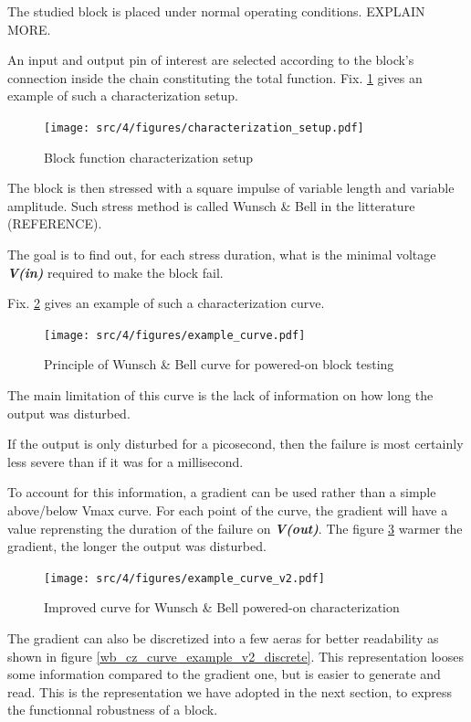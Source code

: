 The studied block is placed under normal operating conditions. EXPLAIN MORE.

An input and output pin of interest are selected according to the block's connection inside the chain constituting the total function.
Fix. \ref{block_function_cz} gives an example of such a characterization setup.

\begin{figure}[!htbp]
  \centering
  \texttt{[image: src/4/figures/characterization\_setup.pdf]}
  \caption{Block function characterization setup}
  \label{block_function_cz}
\end{figure}

The block is then stressed with a square impulse of variable length and variable amplitude.
Such stress method is called Wunsch & Bell in the litterature (REFERENCE).

The goal is to find out, for each stress duration, what is the minimal voltage \textbf{\textit{V(in)}} required to make the block fail.

Fix. \ref{wb_cz_curve_example} gives an example of such a characterization curve.

\begin{figure}[!htbp]
  \centering
  \texttt{[image: src/4/figures/example\_curve.pdf]}
  \caption{Principle of Wunsch & Bell curve for powered-on block testing}
  \label{wb_cz_curve_example}
\end{figure}

The main limitation of this curve is the lack of information on how long the output was disturbed.

If the output is only disturbed for a picosecond, then the failure is most certainly less severe than if it was for a millisecond.

To account for this information, a gradient can be used rather than a simple above/below Vmax curve.
For each point of the curve, the gradient will have a value reprensting the duration of the failure on \textbf{\textit{V(out)}}.
The figure \ref{wb_cz_curve_example_v2} warmer the gradient, the longer the output was disturbed.

\begin{figure}[!htbp]
  \centering
  \texttt{[image: src/4/figures/example\_curve\_v2.pdf]}
  \caption{Improved curve for Wunsch & Bell powered-on characterization}
  \label{wb_cz_curve_example_v2}
\end{figure}

The gradient can also be discretized into a few aeras for better readability as shown in figure \ref{wb_cz_curve_example_v2_discrete}.
This representation looses some information compared to the gradient one, but is easier to generate and read.
This is the representation we have adopted in the next section, to express the functionnal robustness of a block.

